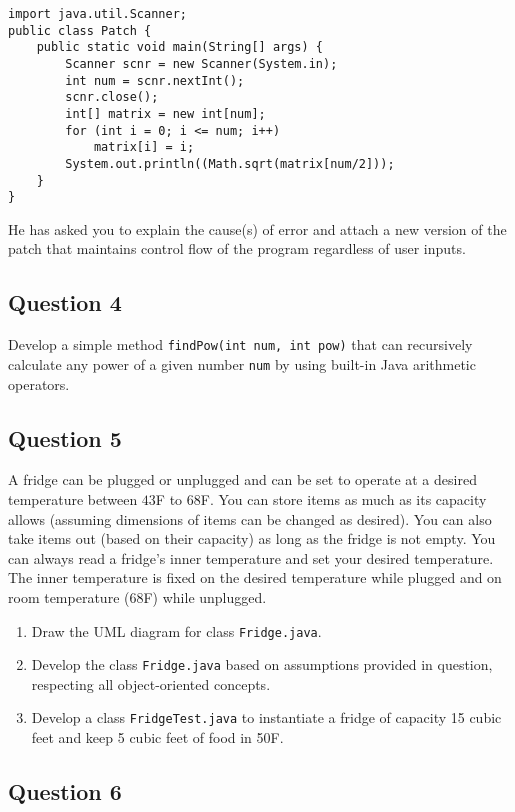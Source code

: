 \begin{lstlisting}
import java.util.Scanner;
public class Patch {
	public static void main(String[] args) {
		Scanner scnr = new Scanner(System.in);
		int num = scnr.nextInt();
		scnr.close();
		int[] matrix = new int[num];
		for (int i = 0; i <= num; i++)
			matrix[i] = i;
		System.out.println((Math.sqrt(matrix[num/2]));
	}
}
\end{lstlisting}

He has asked you to explain the cause(s) of error and attach a new version of the patch that maintains control flow of the program regardless of user inputs.

\newpage
\subsection*{Question 4}
Develop a simple method \texttt{findPow(int num, int pow)} that can recursively calculate any power of a given number \texttt{num} by using built-in Java arithmetic operators.

\newpage
\subsection*{Question 5}

A fridge can be plugged or unplugged and can be set to operate at a desired temperature between $43$F to $68$F. You can store items as much as its capacity allows (assuming dimensions of items can be changed as desired). You can also take items out (based on their capacity) as long as the fridge is not empty.
You can always read a fridge's inner temperature and set your desired temperature. The inner temperature is fixed on the desired temperature while plugged and on room temperature (68F) while unplugged.

\begin{enumerate}[label=(\alph*)]
\item Draw the UML diagram for class \texttt{Fridge.java}.
\item Develop the class \texttt{Fridge.java} based on assumptions provided in question, respecting all object-oriented concepts.
\item Develop a class \texttt{FridgeTest.java} to instantiate a fridge of capacity 15 cubic feet and keep 5 cubic feet of food in 50F.
\end{enumerate}

\newpage
\subsection*{Question 6}

